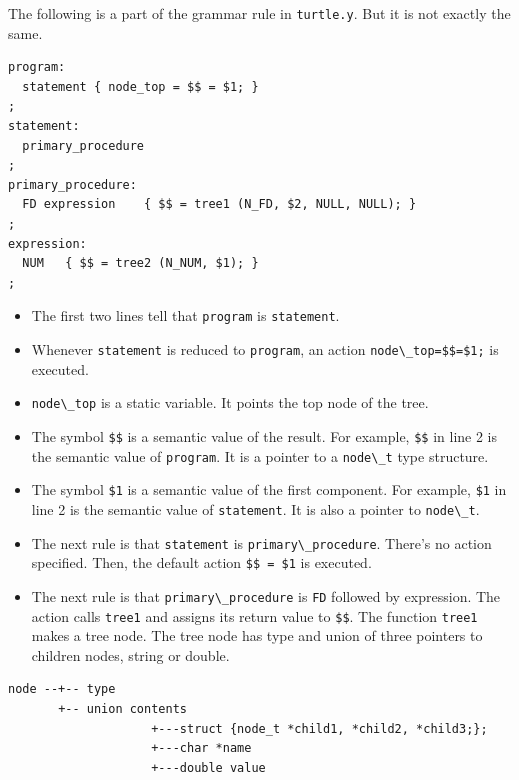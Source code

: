 The following is a part of the grammar rule in
\passthrough{\lstinline!turtle.y!}. But it is not exactly the same.

\begin{lstlisting}
program:
  statement { node_top = $$ = $1; }
;
statement:
  primary_procedure
;
primary_procedure:
  FD expression    { $$ = tree1 (N_FD, $2, NULL, NULL); }
;
expression:
  NUM   { $$ = tree2 (N_NUM, $1); }
;
\end{lstlisting}

\begin{itemize}
\tightlist
\item
  The first two lines tell that \passthrough{\lstinline!program!} is
  \passthrough{\lstinline!statement!}.
\item
  Whenever \passthrough{\lstinline!statement!} is reduced to
  \passthrough{\lstinline!program!}, an action
  \passthrough{\lstinline!node\_top=$$=$1;!} is executed.
\item
  \passthrough{\lstinline!node\_top!} is a static variable. It points
  the top node of the tree.
\item
  The symbol \passthrough{\lstinline!$$!} is a semantic value of the
  result. For example, \passthrough{\lstinline!$$!} in line 2 is the
  semantic value of \passthrough{\lstinline!program!}. It is a pointer
  to a \passthrough{\lstinline!node\_t!} type structure.
\item
  The symbol \passthrough{\lstinline!$1!} is a semantic value of the
  first component. For example, \passthrough{\lstinline!$1!} in line 2
  is the semantic value of \passthrough{\lstinline!statement!}. It is
  also a pointer to \passthrough{\lstinline!node\_t!}.
\item
  The next rule is that \passthrough{\lstinline!statement!} is
  \passthrough{\lstinline!primary\_procedure!}. There's no action
  specified. Then, the default action \passthrough{\lstinline!$$ = $1!}
  is executed.
\item
  The next rule is that \passthrough{\lstinline!primary\_procedure!} is
  \passthrough{\lstinline!FD!} followed by expression. The action calls
  \passthrough{\lstinline!tree1!} and assigns its return value to
  \passthrough{\lstinline!$$!}. The function
  \passthrough{\lstinline!tree1!} makes a tree node. The tree node has
  type and union of three pointers to children nodes, string or double.
\end{itemize}

\begin{lstlisting}
node --+-- type
       +-- union contents
                    +---struct {node_t *child1, *child2, *child3;};
                    +---char *name
                    +---double value
\end{lstlisting}

